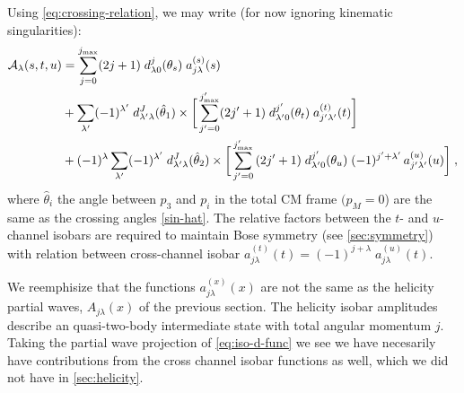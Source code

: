 Using \cref{eq:crossing-relation}, we may write (for now ignoring kinematic singularities):
\begin{align}
  \label{eq:iso-d-func}
   \mathcal{A}_\lambda(s,t,u) &= \sum_{j = 0}^{{j_\text{max}}} (2 j+1) \; d_{\lambda0}^j(\theta_s) \; a_{j \lambda}^{(s)}(s)
    \nonumber \\
   &+ \sum_{\lambda^\prime} (-1)^{\lambda^\prime} \; d_{{\lambda^\prime} \lambda}^J(\hat{\theta}_1) \times
   \bigg[
   \sum_{{j^\prime} = 0}^{{j^\prime_\text{max}}} (2{j^\prime}+1) \; d_{{\lambda^\prime}0}^{j^\prime}(\theta_t) \; a_{{j^\prime} {\lambda^\prime}}^{(t)}(t)
   \bigg] \\
  &+  (-1)^\lambda \sum_{{\lambda^\prime}} (-1)^{{\lambda^\prime}} \; d^{J}_{{\lambda^\prime}\lambda }(\hat{\theta}_2)
  \times
  \bigg[
  \sum_{{j^\prime} = 0}^{{j^\prime_\text{max}}} \, (2{j^\prime}+1) \; d_{{\lambda^\prime}0}^{j^\prime}(\theta_u) \;  (-1)^{{j^\prime} + {\lambda^\prime}}
    \, a_{{j^\prime} {\lambda^\prime}}^{(u)}(u)
  \bigg] \; ,
  \nonumber
  \end{align}
where \(\hat{\theta}_i\) the angle between \(p_3\) and \(p_i\) in the total CM frame \((p_M = 0\)) are the same as the crossing angles \cref{sin-hat}. The relative factors between the \(t\)- and \(u\)-channel isobars are required to maintain Bose symmetry (see \cref{sec:symmetry}) with relation between cross-channel isobar \(a_{j\lambda}^{(t)}(t) = (-1)^{j + \lambda} \; a_{j\lambda}^{(u)}(t)\).

 We reemphisize that the functions \(a^{(x)}_{j\lambda}(x)\) are not the same as the helicity partial waves, \(A_{j\lambda}(x)\) of the previous section. The helicity isobar amplitudes describe an quasi-two-body intermediate state with total angular momentum \(j\). Taking the partial wave projection of \cref{eq:iso-d-func} we see we have necesarily have contributions from the cross channel isobar functions as well, which we did not have in \cref{sec:helicity}.


